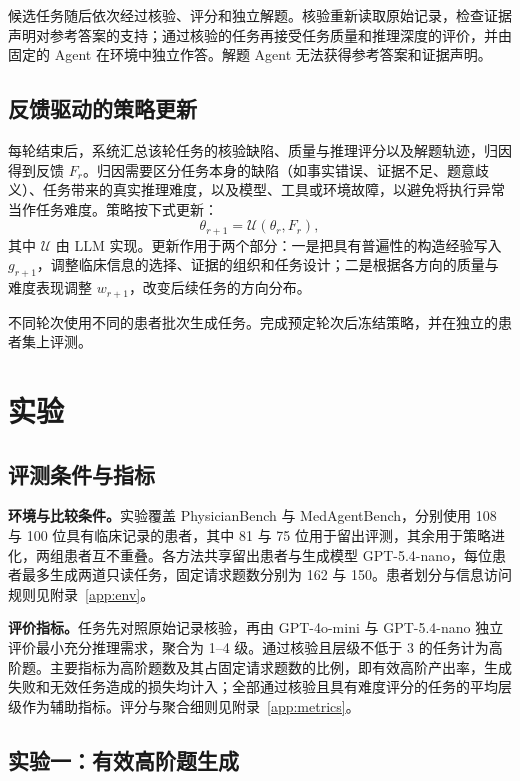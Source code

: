 候选任务随后依次经过核验、评分和独立解题。核验重新读取原始记录，检查证据声明对参考答案的支持；通过核验的任务再接受任务质量和推理深度的评价，并由固定的 Agent 在环境中独立作答。解题 Agent 无法获得参考答案和证据声明。

\subsection{反馈驱动的策略更新}

每轮结束后，系统汇总该轮任务的核验缺陷、质量与推理评分以及解题轨迹，归因得到反馈 $F_r$。归因需要区分任务本身的缺陷（如事实错误、证据不足、题意歧义）、任务带来的真实推理难度，以及模型、工具或环境故障，以避免将执行异常当作任务难度。策略按下式更新：
\begin{equation}
\theta_{r+1}=\mathcal{U}(\theta_r,F_r),
\end{equation}
其中 $\mathcal{U}$ 由 LLM 实现。更新作用于两个部分：一是把具有普遍性的构造经验写入 $g_{r+1}$，调整临床信息的选择、证据的组织和任务设计；二是根据各方向的质量与难度表现调整 $w_{r+1}$，改变后续任务的方向分布。

不同轮次使用不同的患者批次生成任务。完成预定轮次后冻结策略，并在独立的患者集上评测。

\section{实验}

\subsection{评测条件与指标}

\textbf{环境与比较条件。}实验覆盖 PhysicianBench 与 MedAgentBench，分别使用 108 与 100 位具有临床记录的患者，其中 81 与 75 位用于留出评测，其余用于策略进化，两组患者互不重叠。各方法共享留出患者与生成模型 GPT-5.4-nano，每位患者最多生成两道只读任务，固定请求题数分别为 162 与 150。患者划分与信息访问规则见附录~\ref{app:env}。

\textbf{评价指标。}任务先对照原始记录核验，再由 GPT-4o-mini 与 GPT-5.4-nano 独立评价最小充分推理需求，聚合为 1--4 级。通过核验且层级不低于 3 的任务计为高阶题。主要指标为高阶题数及其占固定请求题数的比例，即有效高阶产出率，生成失败和无效任务造成的损失均计入；全部通过核验且具有难度评分的任务的平均层级作为辅助指标。评分与聚合细则见附录~\ref{app:metrics}。

\subsection{实验一：有效高阶题生成}

